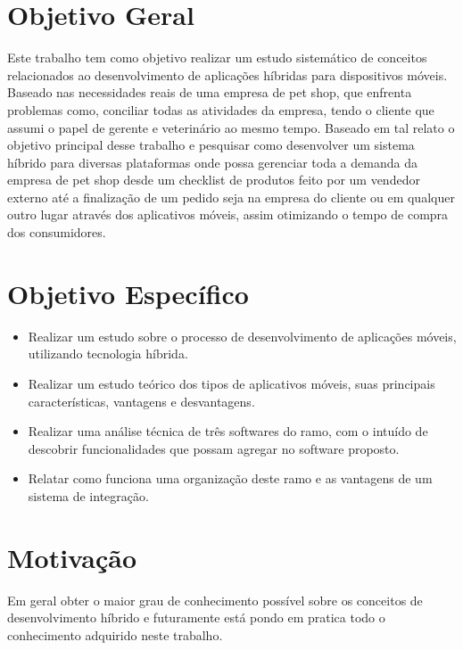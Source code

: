 \documentclass[12pt,openright,twoside,a4paper,english,french,spanish,brazil]{abntex2}
\begin{document}

\section*{Objetivo Geral}
Este trabalho tem como objetivo realizar um estudo sistemático de conceitos relacionados ao desenvolvimento de aplicações híbridas para dispositivos móveis. Baseado nas necessidades reais de uma empresa de pet shop, que enfrenta problemas como, conciliar todas as atividades da empresa, tendo o cliente que assumi o papel de gerente e veterinário ao mesmo tempo.
Baseado em tal relato o objetivo principal desse trabalho e pesquisar como desenvolver um sistema híbrido para diversas plataformas onde possa gerenciar toda a demanda da empresa de pet shop desde um checklist de produtos feito por um vendedor externo até a finalização de um pedido seja na empresa do cliente ou em qualquer outro lugar através dos aplicativos móveis, assim otimizando o tempo de compra dos consumidores.

\section*{Objetivo Específico}
\begin{itemize}
\item Realizar um estudo sobre o processo de desenvolvimento de aplicações móveis, utilizando tecnologia híbrida.
\item Realizar um estudo teórico dos tipos de aplicativos móveis, suas principais características, vantagens e desvantagens.
\item Realizar uma análise técnica de três softwares do ramo, com o intuído de descobrir funcionalidades que possam agregar no software proposto.
\item Relatar como funciona uma organização deste ramo e as vantagens de um sistema de integração.
\end{itemize}

\section*{Motivação}
Em geral obter o maior grau de conhecimento possível sobre os conceitos de desenvolvimento híbrido e futuramente está pondo em pratica todo o conhecimento adquirido neste trabalho. 
\end{document}
